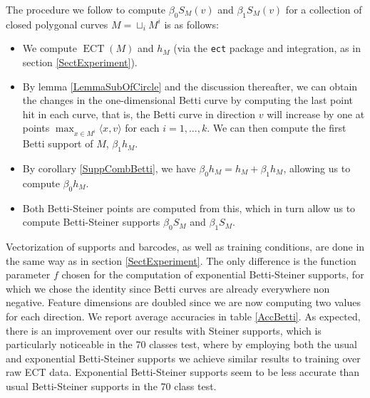 \documentclass[a4paper]{article}
\newcommand{\ECT}{\operatorname{ECT}}
\newcommand{\la}{\langle}
\newcommand{\ra}{\rangle}
\begin{document}
The procedure we follow to compute $\beta_0S_M(v)$ and $\beta_1S_M(v)$ for a collection of closed polygonal curves $M=\sqcup_i M^i$ is as follows:
\begin{itemize}
	\item We compute $\ECT(M)$ and $h_M$ (via the \texttt{ect} package and integration, as in section \ref{SectExperiment}).
	\item By lemma \ref{LemmaSubOfCircle} and the discussion thereafter, we can obtain the changes in the one-dimensional Betti curve by computing the last point hit in each curve, that is, the Betti curve in direction $v$ will increase by one at points $\max_{x \in M^i} \la x,v \ra$ for each $i=1,...,k$. We can then compute the first Betti support of $M$, $\beta_1h_M$.
	\item By corollary \ref{SuppCombBetti}, we have $\beta_0h_M = h_M +\beta_1h_M$, allowing us to compute $\beta_0h_M$.
	\item Both Betti-Steiner points are computed from this, which in turn allow us to compute Betti-Steiner supports $\beta_0S_M$ and $\beta_1S_M$.
\end{itemize}

 Vectorization of supports and barcodes, as well as training conditions, are done in the same way as in section \ref{SectExperiment}. The only difference is the function parameter $f$ chosen for the computation of exponential Betti-Steiner supports, for which we chose the identity since Betti curves are already everywhere non negative. Feature dimensions are doubled since we are now computing two values for each direction. We report average accuracies in table \ref{AccBetti}. As expected, there is an improvement over our results with Steiner supports, which is particularly noticeable in the 70 classes test, where by employing both the usual and exponential Betti-Steiner supports we achieve similar results to training over raw ECT data. Exponential Betti-Steiner supports seem to be less accurate than usual Betti-Steiner supports in the 70 class test.
\end{document}
